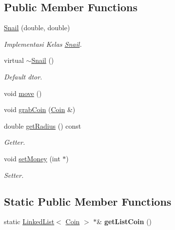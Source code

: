 \subsection*{Public Member Functions}
\begin{DoxyCompactItemize}
\item 
\mbox{\hyperlink{class_snail_a8a24e3446fddbfbbd064c5ee9337fa90}{Snail}} (double, double)
\begin{DoxyCompactList}\small\item\em Implementasi Kelas \mbox{\hyperlink{class_snail}{Snail}}. \end{DoxyCompactList}\item 
\mbox{\label{class_snail_a63165ec180dabd0c3735b51b9812c7a7}} 
virtual \mbox{\hyperlink{class_snail_a63165ec180dabd0c3735b51b9812c7a7}{$\sim$\+Snail}} ()
\begin{DoxyCompactList}\small\item\em Default dtor. \end{DoxyCompactList}\item 
void \mbox{\hyperlink{class_snail_af5892ec122d9199480c813b74488256b}{move}} ()
\item 
void \mbox{\hyperlink{class_snail_a5978e47ea4eeb7dce4890d1d8121de7e}{grab\+Coin}} (\mbox{\hyperlink{class_coin}{Coin}} \&)
\item 
\mbox{\label{class_snail_a90b7b428761619d40e3b33832806d80c}} 
double \mbox{\hyperlink{class_snail_a90b7b428761619d40e3b33832806d80c}{get\+Radius}} () const
\begin{DoxyCompactList}\small\item\em Getter. \end{DoxyCompactList}\item 
\mbox{\label{class_snail_a3accad14fc8c7b2aa86ac1af9ec46b54}} 
void \mbox{\hyperlink{class_snail_a3accad14fc8c7b2aa86ac1af9ec46b54}{set\+Money}} (int $\ast$)
\begin{DoxyCompactList}\small\item\em Setter. \end{DoxyCompactList}\end{DoxyCompactItemize}
\subsection*{Static Public Member Functions}
\begin{DoxyCompactItemize}
\item 
\mbox{\label{class_snail_acbcfdcc579e201934fd331b9c3a9e76f}} 
static \mbox{\hyperlink{class_linked_list}{Linked\+List}}$<$ \mbox{\hyperlink{class_coin}{Coin}} $>$ $\ast$\& {\bfseries get\+List\+Coin} ()
\end{DoxyCompactItemize}


